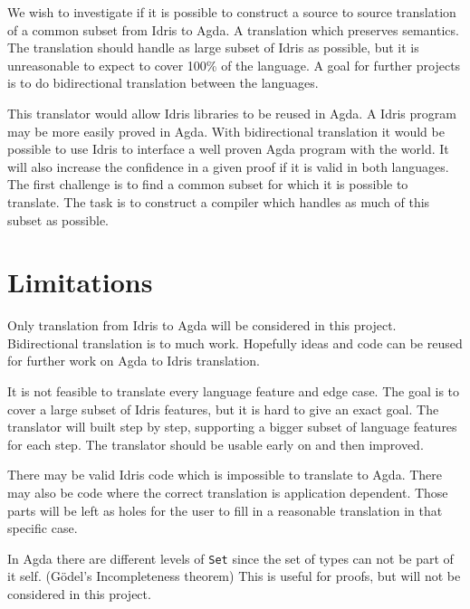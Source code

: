 \documentclass[parskip=half]{scrartcl}
\begin{document}
We wish to investigate if it is possible to construct a source to source
translation of a common subset from Idris to Agda. A translation which
preserves semantics. The translation should handle as large subset of Idris as
possible, but it is unreasonable to expect to cover 100\% of the language.
A goal for further projects is to do bidirectional translation between the
languages.

This translator would allow Idris libraries to be reused in Agda. A Idris
program may be more easily proved in Agda. With bidirectional translation it
would be possible to use Idris to interface a well proven Agda program with the
world.  It will also increase the confidence in a given proof if it is valid in
both languages.  The first challenge is to find a common subset for which it is
possible to translate. The task is to construct a compiler which handles as
much of this subset as possible.


\section{Limitations}
Only translation from Idris to Agda will be considered in this project.
Bidirectional translation is to much work. Hopefully ideas and code can be
reused for further work on Agda to Idris translation.

It is not feasible to translate every language feature and edge case.  The goal
is to cover a large subset of Idris features, but it is hard to give an exact
goal.  The translator will built step by step, supporting a bigger subset of
language features for each step. The translator should be usable early on and
then improved.

There may be valid Idris code which is impossible to translate to Agda. There
may also be code where the correct translation is application dependent. Those
parts will be left as holes for the user to fill in a reasonable translation in
that specific case.


In Agda there are different levels of \texttt{Set} since the set of types can not be
part of it self. (Gödel's Incompleteness theorem) This is useful for proofs, but
will not be considered in this project.
\end{document}
